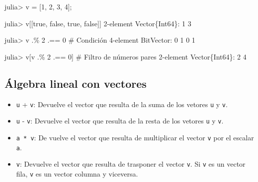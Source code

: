 \documentclass[
  letterpaper,
  DIV=11,
  numbers=noendperiod]{scrreprt}
\newenvironment{Shaded}{\begin{snugshade}}{\end{snugshade}}
\newcommand{\CommentTok}[1]{\textcolor[rgb]{0.37,0.37,0.37}{#1}}
\newcommand{\ConstantTok}[1]{\textcolor[rgb]{0.56,0.35,0.01}{#1}}
\newcommand{\DataTypeTok}[1]{\textcolor[rgb]{0.68,0.00,0.00}{#1}}
\newcommand{\FloatTok}[1]{\textcolor[rgb]{0.68,0.00,0.00}{#1}}
\newcommand{\NormalTok}[1]{\textcolor[rgb]{0.00,0.23,0.31}{#1}}
\newcommand{\OperatorTok}[1]{\textcolor[rgb]{0.37,0.37,0.37}{#1}}
\providecommand{\tightlist}{%
  \setlength{\itemsep}{0pt}\setlength{\parskip}{0pt}}\usepackage{longtable,booktabs,array}
\begin{document}
\begin{Shaded}
\begin{Highlighting}[]
\NormalTok{julia}\OperatorTok{\textgreater{}}\NormalTok{ v }\OperatorTok{=}\NormalTok{ [}\FloatTok{1}\NormalTok{, }\FloatTok{2}\NormalTok{, }\FloatTok{3}\NormalTok{, }\FloatTok{4}\NormalTok{];}

\NormalTok{julia}\OperatorTok{\textgreater{}}\NormalTok{ v[[}\ConstantTok{true}\NormalTok{, }\ConstantTok{false}\NormalTok{, }\ConstantTok{true}\NormalTok{, }\ConstantTok{false}\NormalTok{]]}
\FloatTok{2}\OperatorTok{{-}}\NormalTok{element }\DataTypeTok{Vector}\NormalTok{\{}\DataTypeTok{Int64}\NormalTok{\}}\OperatorTok{:}
 \FloatTok{1}
 \FloatTok{3}

\NormalTok{julia}\OperatorTok{\textgreater{}}\NormalTok{ v }\OperatorTok{.\%} \FloatTok{2} \OperatorTok{.==} \FloatTok{0}  \CommentTok{\# Condición}
\FloatTok{4}\OperatorTok{{-}}\NormalTok{element }\DataTypeTok{BitVector}\OperatorTok{:}
 \FloatTok{0}
 \FloatTok{1}
 \FloatTok{0}
 \FloatTok{1}

\NormalTok{julia}\OperatorTok{\textgreater{}}\NormalTok{ v[v }\OperatorTok{.\%} \FloatTok{2} \OperatorTok{.==} \FloatTok{0}\NormalTok{]  }\CommentTok{\# Filtro de números pares}
\FloatTok{2}\OperatorTok{{-}}\NormalTok{element }\DataTypeTok{Vector}\NormalTok{\{}\DataTypeTok{Int64}\NormalTok{\}}\OperatorTok{:}
 \FloatTok{2}
 \FloatTok{4}
\end{Highlighting}
\end{Shaded}

\hypertarget{uxe1lgebra-lineal-con-vectores}{%
\subsection{Álgebra lineal con
vectores}\label{uxe1lgebra-lineal-con-vectores}}

\begin{itemize}
\tightlist
\item
  \texttt{u} + \texttt{v}: Devuelve el vector que resulta de la suma de
  los vetores \texttt{u} y \texttt{v}.
\item
  \texttt{u} - \texttt{v}: Devuelve el vector que resulta de la resta de
  los vetores \texttt{u} y \texttt{v}.
\item
  \texttt{a\ *\ v}: De vuelve el vector que resulta de multiplicar el
  vector \texttt{v} por el escalar \texttt{a}.
\item
  \texttt{v\textquotesingle{}}: Devuelve el vector que resulta de
  trasponer el vector \texttt{v}. Si \texttt{v} es un vector fila,
  \texttt{v\textquotesingle{}} es un vector columna y viceversa.
\end{itemize}
\end{document}
